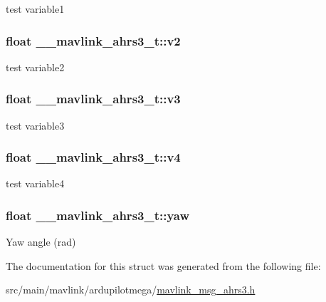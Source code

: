 test variable1 

\hypertarget{struct____mavlink__ahrs3__t_a04cb7fc00c480230de61e8c90b170343}{
\subsubsection[{v2}]{\setlength{\rightskip}{0pt plus 5cm}float \+\_\+\+\_\+mavlink\+\_\+ahrs3\+\_\+t\+::v2}}\label{struct____mavlink__ahrs3__t_a04cb7fc00c480230de61e8c90b170343}


test variable2 

\hypertarget{struct____mavlink__ahrs3__t_ab23392588c1f0b8652ca7dcabb2bc24f}{
\subsubsection[{v3}]{\setlength{\rightskip}{0pt plus 5cm}float \+\_\+\+\_\+mavlink\+\_\+ahrs3\+\_\+t\+::v3}}\label{struct____mavlink__ahrs3__t_ab23392588c1f0b8652ca7dcabb2bc24f}


test variable3 

\hypertarget{struct____mavlink__ahrs3__t_ad05431d92d5ae17adf54ec2879622b95}{
\subsubsection[{v4}]{\setlength{\rightskip}{0pt plus 5cm}float \+\_\+\+\_\+mavlink\+\_\+ahrs3\+\_\+t\+::v4}}\label{struct____mavlink__ahrs3__t_ad05431d92d5ae17adf54ec2879622b95}


test variable4 

\hypertarget{struct____mavlink__ahrs3__t_a114b9b517acb3aca56651c508b8d4a1c}{
\subsubsection[{yaw}]{\setlength{\rightskip}{0pt plus 5cm}float \+\_\+\+\_\+mavlink\+\_\+ahrs3\+\_\+t\+::yaw}}\label{struct____mavlink__ahrs3__t_a114b9b517acb3aca56651c508b8d4a1c}


Yaw angle (rad) 



The documentation for this struct was generated from the following file\+:\begin{DoxyCompactItemize}
\item 
src/main/mavlink/ardupilotmega/\hyperlink{mavlink__msg__ahrs3_8h}{mavlink\+\_\+msg\+\_\+ahrs3.\+h}\end{DoxyCompactItemize}
